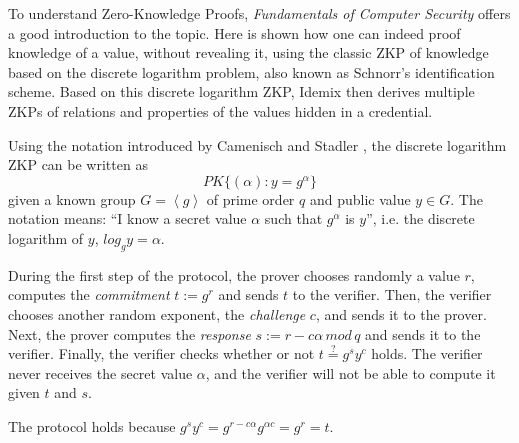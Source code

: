 
To understand Zero-Knowledge Proofs, \textit{Fundamentals of Computer Security} \cite[Chapter 12]{book:856771} offers a good introduction to the topic. Here is shown how one can indeed proof knowledge of a value, without revealing it, using the classic ZKP of knowledge based on the discrete logarithm problem, also known as Schnorr's identification scheme. Based on this discrete logarithm ZKP, Idemix then derives multiple ZKPs of relations and properties of the values hidden in a credential.


Using the notation introduced by Camenisch and Stadler \cite{camenisch1997efficient}, the discrete logarithm ZKP can be written as 
\[ PK\{ (\alpha) : y = g^\alpha \}  \]
given a known group $G=\left\langle g \right\rangle $ of prime order $q$ and public value $y\in G$. The notation means: ``I know a secret value $\alpha$ such that $g^\alpha$ is $y$'', i.e. the discrete logarithm of $y$, $log_g y = \alpha$.


During the first step of the protocol, the prover chooses randomly a value $r$, computes the \textit{commitment} $t := g^{r}$ and sends $t$ to the verifier. 
Then, the verifier chooses another random exponent, the \textit{challenge} $c$, and sends it to the prover. 
Next, the prover computes the \textit{response} $s:=r-c\alpha\, mod\, q$ and sends it to the verifier.
Finally, the verifier checks whether or not $ t \overset{?}{=} g^{s} y^c $ holds. The verifier never receives the secret value $\alpha$, and the verifier will not be able to compute it given $t$ and $s$.

The protocol holds because $ g^{s} y^c  =  g^{r - c\alpha} g^{\alpha c} = g^{r} = t $.

